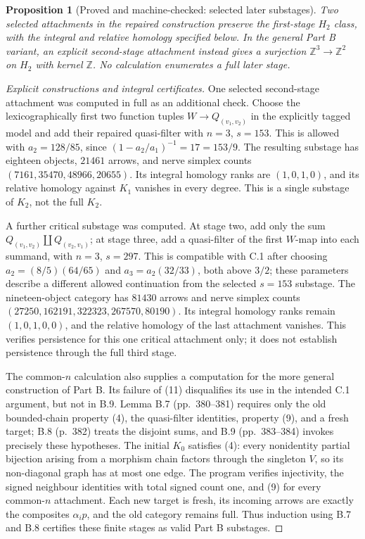 \documentclass[11pt,a4paper]{article}
\newcommand{\Z}{\mathbb Z}
\newtheorem{proposition}[theorem]{Proposition}
\theoremstyle{definition}
\begin{document}
\begin{proposition}[Proved and machine-checked: selected later substages]\label{C:substages}
Two selected attachments in the repaired construction preserve the first-stage $H_2$ class, with the integral and relative homology specified below. In the general Part B variant, an explicit second-stage attachment instead gives a surjection $\Z^3\to\Z^2$ on $H_2$ with kernel $\Z$. No calculation enumerates a full later stage.\end{proposition}
\begin{proof}[Explicit constructions and integral certificates]
One selected second-stage attachment was computed in full as an additional check.  Choose the lexicographically first two function
tuples $W\to Q_{(v_1,v_2)}$ in the explicitly tagged model and add their
repaired quasi-filter with $n=3$, $s=153$.  This is allowed with
$a_2=128/85$, since $(1-a_2/a_1)^{-1}=17=153/9$.
The resulting substage has eighteen objects, $21461$ arrows, and nerve
simplex counts $(7161,35470,48966,20655)$.
Its integral homology ranks are $(1,0,1,0)$, and its relative homology
against $K_1$ vanishes in every degree.  This is a single substage of
$K_2$, not the full $K_2$.

A further critical substage was computed.  At stage two, add only the
sum $Q_{(v_1,v_2)}\amalg Q_{(v_2,v_1)}$; at stage three, add a
quasi-filter of the first $W$-map into each summand, with $n=3$, $s=297$.
This is compatible with C.1 after choosing
$a_2=(8/5)(64/65)$ and $a_3=a_2(32/33)$, both above $3/2$;
these parameters describe a different allowed continuation from the
selected $s=153$ substage.  The nineteen-object category has $81430$
arrows and nerve simplex counts
$(27250,162191,322323,267570,80190)$.
Its integral homology ranks remain $(1,0,1,0,0)$, and the relative
homology of the last attachment vanishes.  This verifies persistence
for this one critical attachment only; it does not establish persistence
through the full third stage.

The common-$n$ calculation also supplies a computation for the more
general construction of Part B. Its failure of (11) disqualifies its
use in the intended C.1 argument, but not in B.9.
Lemma B.7 (pp.~380--381) requires only the old bounded-chain property
(4), the quasi-filter identities, property (9), and a fresh target;
B.8 (p.~382) treats the disjoint sums, and B.9 (pp.~383--384)
invokes precisely these hypotheses. The initial $K_0$ satisfies (4):
every nonidentity partial bijection arising from a morphism chain
factors through the singleton $V$, so its non-diagonal graph has at
most one edge. The program verifies injectivity, the signed neighbour
identities with total signed count one, and (9) for every common-$n$
attachment. Each new target is fresh, its incoming arrows are exactly
the composites $\alpha_i p$, and the old category remains full.
Thus induction using B.7 and B.8 certifies these finite stages as
valid Part B substages.


\end{proof}
\end{document}
